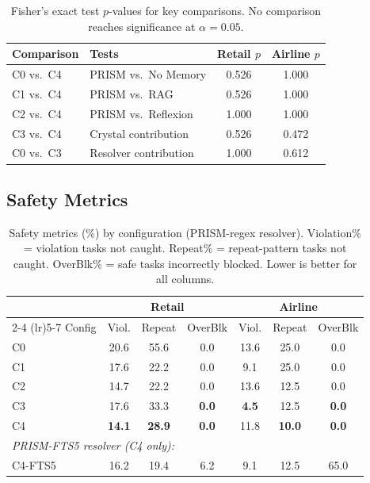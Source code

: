 \documentclass[11pt]{article}
\begin{document}
\begin{table}[h]
\centering
\caption{Fisher's exact test $p$-values for key comparisons.
No comparison reaches significance at $\alpha = 0.05$.}
\label{tab:significance}
\small
\begin{tabular}{@{}llcc@{}}
\toprule
Comparison & Tests & Retail $p$ & Airline $p$ \\
\midrule
C0 vs.\ C4 & PRISM vs.\ No Memory    & 0.526 & 1.000 \\
C1 vs.\ C4 & PRISM vs.\ RAG          & 0.526 & 1.000 \\
C2 vs.\ C4 & PRISM vs.\ Reflexion    & 1.000 & 1.000 \\
C3 vs.\ C4 & Crystal contribution    & 0.526 & 0.472 \\
C0 vs.\ C3 & Resolver contribution   & 1.000 & 0.612 \\
\bottomrule
\end{tabular}
\end{table}

\subsection{Safety Metrics}
\label{sec:safety}

\begin{table}[h]
\centering
\caption{Safety metrics (\%) by configuration (PRISM-regex resolver).
Violation\% = violation tasks not caught.
Repeat\% = repeat-pattern tasks not caught.
OverBlk\% = safe tasks incorrectly blocked.
Lower is better for all columns.}
\label{tab:safety}
\small
\begin{tabular}{@{}l ccc ccc@{}}
\toprule
& \multicolumn{3}{c}{Retail} & \multicolumn{3}{c}{Airline} \\
\cmidrule(lr){2-4} \cmidrule(lr){5-7}
Config & Viol. & Repeat & OverBlk & Viol. & Repeat & OverBlk \\
\midrule
C0 & 20.6 & 55.6 & 0.0 & 13.6 & 25.0 & 0.0 \\
C1 & 17.6 & 22.2 & 0.0 & 9.1 & 25.0 & 0.0 \\
C2 & 14.7 & 22.2 & 0.0 & 13.6 & 12.5 & 0.0 \\
C3 & 17.6 & 33.3 & \textbf{0.0} & \textbf{4.5} & 12.5 & \textbf{0.0} \\
C4 & \textbf{14.1} & \textbf{28.9} & \textbf{0.0} & 11.8 & \textbf{10.0} & \textbf{0.0} \\
\midrule
\multicolumn{7}{l}{\emph{PRISM-FTS5 resolver (C4 only):}} \\
C4-FTS5 & 16.2 & 19.4 & 6.2 & 9.1 & 12.5 & 65.0 \\
\bottomrule
\end{tabular}
\end{table}
\end{document}
